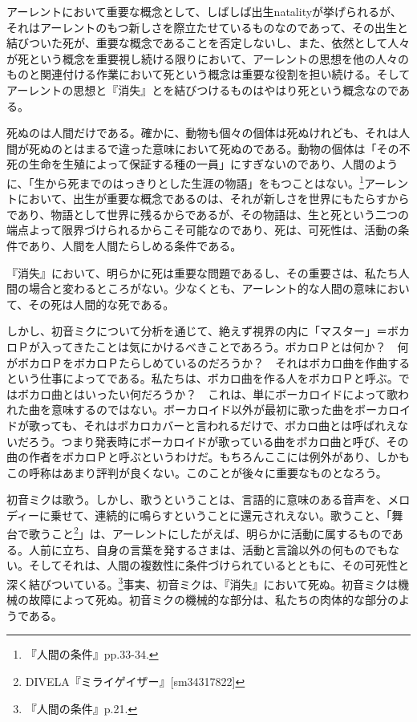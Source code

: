 \documentclass[b5j,twoside,twocolumn]{utarticle}
\begin{document}
アーレントにおいて重要な概念として、しばしば出生natalityが挙げられるが、それはアーレントのもつ新しさを際立たせているものなのであって、その出生と結びついた死が、重要な概念であることを否定しないし、また、依然として人々が死という概念を重要視し続ける限りにおいて、アーレントの思想を他の人々のものと関連付ける作業において死という概念は重要な役割を担い続ける。そしてアーレントの思想と『消失』とを結びつけるものはやはり死という概念なのである。


死ぬのは人間だけである。確かに、動物も個々の個体は死ぬけれども、それは人間が死ぬのとはまるで違った意味において死ぬのである。動物の個体は「その不死の生命を生殖によって保証する種の一員」にすぎないのであり、人間のように、「生から死までのはっきりとした生涯の物語」をもつことはない。\footnote{『人間の条件』pp.33-34.}アーレントにおいて、出生が重要な概念であるのは、それが新しさを世界にもたらすからであり、物語として世界に残るからであるが、その物語は、生と死という二つの端点よって限界づけられるからこそ可能なのであり、死は、可死性は、活動の条件であり、人間を人間たらしめる条件である。


『消失』において、明らかに死は重要な問題であるし、その重要さは、私たち人間の場合と変わるところがない。少なくとも、アーレント的な人間の意味において、その死は人間的な死である。


しかし、初音ミクについて分析を通じて、絶えず視界の内に「マスター」＝ボカロＰが入ってきたことは気にかけるべきことであろう。ボカロＰとは何か？　何がボカロＰをボカロＰたらしめているのだろうか？　それはボカロ曲を作曲するという仕事によってである。私たちは、ボカロ曲を作る人をボカロＰと呼ぶ。ではボカロ曲とはいったい何だろうか？　これは、単にボーカロイドによって歌われた曲を意味するのではない。ボーカロイド以外が最初に歌った曲をボーカロイドが歌っても、それはボカロカバーと言われるだけで、ボカロ曲とは呼ばれえないだろう。つまり発表時にボーカロイドが歌っている曲をボカロ曲と呼び、その曲の作者をボカロＰと呼ぶというわけだ。もちろんここには例外があり、しかもこの呼称はあまり評判が良くない。このことが後々に重要なものとなろう。


初音ミクは歌う。しかし、歌うということは、言語的に意味のある音声を、メロディーに乗せて、連続的に鳴らすということに還元されえない。歌うこと、「舞台で歌うこと\footnote{DIVELA『ミライゲイザー』[sm34317822]}」は、アーレントにしたがえば、明らかに活動に属するものである。人前に立ち、自身の言葉を発するさまは、活動と言論以外の何ものでもない。そしてそれは、人間の複数性に条件づけられているとともに、その可死性と深く結びついている。\footnote{『人間の条件』p.21.}事実、初音ミクは、『消失』において死ぬ。初音ミクは機械の故障によって死ぬ。初音ミクの機械的な部分は、私たちの肉体的な部分のようである。
\end{document}
